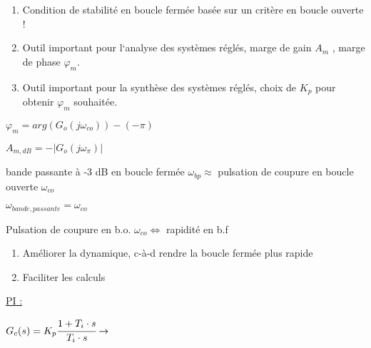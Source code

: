 
\hformbar

\newpage


\begin{enumerate}
    \item Condition de stabilité en boucle fermée basée sur un critère en boucle ouverte !
    \item Outil important pour l‘analyse des systèmes réglés, marge de gain $A_m$ , marge de phase $\varphi_m$.
    \item Outil important pour la synthèse des systèmes réglés, choix de $K_p$ pour obtenir $\varphi_m$ souhaitée.
\end{enumerate}

$\varphi_m = arg(G_o(j\omega_{co}))- (-\pi)$ \quad [rad]

\vspace{3mm}

$A_{m,dB} = -|G_o(j\omega_{\pi})| $\quad  [dB]

\vspace{3mm}


bande passante à -3 dB en boucle fermée $\omega_{bp} \approx$ pulsation de coupure en boucle ouverte $\omega_{co}$

$\omega_{bande,passante} = \omega_{co}$

Pulsation de coupure en b.o. $\omega_{co} \Leftrightarrow $ rapidité en b.f

\hformbar


\begin{enumerate}
    \item Améliorer la dynamique, c-à-d rendre la boucle fermée plus rapide
    \item Faciliter les calculs
\end{enumerate}



\vspace{2mm}

\underline{PI :}

\vspace{2mm}

{\noindent$G_c(s) = K_p \cfrac{1+T_i \cdot s}{T_i \cdot s} \rightarrow$}

\begin{wrapfigure}[2]{r}{0.25\textwidth}
    \begin{center}
        \vspace{-3.7cm}
    \end{center}
  \end{wrapfigure}

